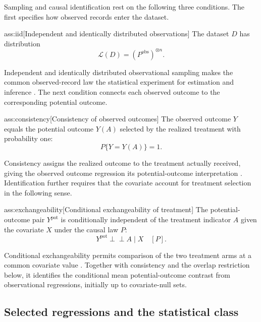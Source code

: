 Sampling and causal identification rest on the following three conditions. The first specifies how observed records enter the dataset.

\begin{assumptionv}{ass:iid}[Independent and identically distributed observations]
The dataset \(D\) has distribution
\[
\mathcal L(D)=(P^{\mathrm{obs}})^{\otimes n}.
\]
\end{assumptionv}

Independent and identically distributed observational sampling makes the common observed-record law the statistical experiment for estimation and inference \citep{KennedyBalakrishnanRobinsWasserman2024}. The next condition connects each observed outcome to the corresponding potential outcome.

\begin{assumptionv}{ass:consistency}[Consistency of observed outcomes]
The observed outcome \(Y\) equals the potential outcome \(Y(A)\) selected by the realized treatment with probability one:
\[
P\{Y=Y(A)\}=1.
\]
\end{assumptionv}

Consistency assigns the realized outcome to the treatment actually received, giving the observed outcome regression its potential-outcome interpretation \citep{KennedyBalakrishnanRobinsWasserman2024}. Identification further requires that the covariate account for treatment selection in the following sense.

\begin{assumptionv}{ass:exchangeability}[Conditional exchangeability of treatment]
The potential-outcome pair \(Y^{\mathrm{pot}}\) is conditionally independent of the treatment indicator \(A\) given the covariate \(X\) under the causal law \(P\):
\[
Y^{\mathrm{pot}}\perp\!\!\!\perp A\mid X\quad[P].
\]
\end{assumptionv}

Conditional exchangeability permits comparison of the two treatment arms at a common covariate value \citep{KennedyBalakrishnanRobinsWasserman2024}. Together with consistency and the overlap restriction below, it identifies the conditional mean potential-outcome contrast from observational regressions, initially up to covariate-null sets.

\subsection{Selected regressions and the statistical class}


